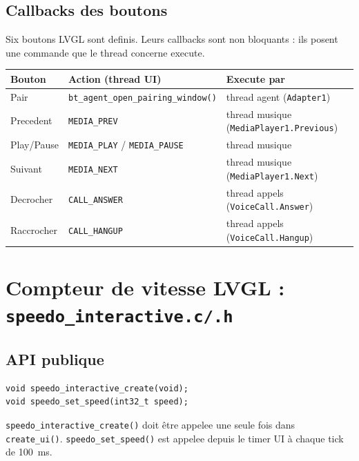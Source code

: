 \documentclass[a4paper,11pt]{article}
\begin{document}
\subsection{Callbacks des boutons}

Six boutons LVGL sont definis. Leurs callbacks sont non bloquants : ils posent une
commande que le thread concerne execute.

\begin{center}
\begin{tabular}{lll}
\toprule
\textbf{Bouton} & \textbf{Action (thread UI)} & \textbf{Execute par} \\
\midrule
Pair & \texttt{bt\_agent\_open\_pairing\_window()} & thread agent (\texttt{Adapter1}) \\
Precedent & \texttt{MEDIA\_PREV} & thread musique (\texttt{MediaPlayer1.Previous}) \\
Play/Pause & \texttt{MEDIA\_PLAY} / \texttt{MEDIA\_PAUSE} & thread musique \\
Suivant & \texttt{MEDIA\_NEXT} & thread musique (\texttt{MediaPlayer1.Next}) \\
Decrocher & \texttt{CALL\_ANSWER} & thread appels (\texttt{VoiceCall.Answer}) \\
Raccrocher & \texttt{CALL\_HANGUP} & thread appels (\texttt{VoiceCall.Hangup}) \\
\bottomrule
\end{tabular}
\end{center}

\section{Compteur de vitesse LVGL : \texttt{speedo\_interactive.c/.h}}

\subsection{API publique}

\begin{lstlisting}[style=ccode,caption={speedo\_interactive.h}]
void speedo_interactive_create(void);
void speedo_set_speed(int32_t speed);
\end{lstlisting}

\texttt{speedo\_interactive\_create()} doit être appelee une seule fois dans
\texttt{create\_ui()}. \texttt{speedo\_set\_speed()} est appelee depuis le timer
UI à chaque tick de 100~ms.
\end{document}
